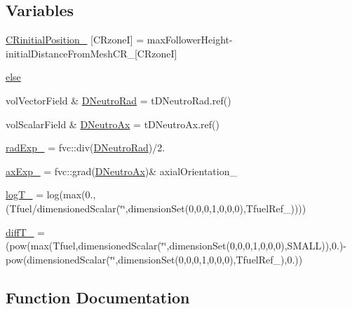 \subsection*{Variables}
\begin{DoxyCompactItemize}
\item 
\hyperlink{setNeutronicsVariablesLowMem_8H_a3990a4a796c70b16472b2334b671e69e}{C\+Rinitial\+Position\+\_\+} \mbox{[}C\+RzoneI\mbox{]} = max\+Follower\+Height-\/initial\+Distance\+From\+Mesh\+C\+R\+\_\+\mbox{[}C\+RzoneI\mbox{]}
\item 
\hyperlink{setNeutronicsVariablesLowMem_8H_a0544c3fe466e421738dae463968b70ba}{else}
\item 
vol\+Vector\+Field \& \hyperlink{setNeutronicsVariablesLowMem_8H_a87a8e73540cc64ca6321cea333ded9ac}{D\+Neutro\+Rad} = t\+D\+Neutro\+Rad.\+ref()
\item 
vol\+Scalar\+Field \& \hyperlink{setNeutronicsVariablesLowMem_8H_acbede4ae4993afe497317c8781340cb6}{D\+Neutro\+Ax} = t\+D\+Neutro\+Ax.\+ref()
\item 
\hyperlink{setNeutronicsVariablesLowMem_8H_a526ceca549702fe9fb823405772ca135}{rad\+Exp\+\_\+} = fvc\+::div(\hyperlink{setNeutronicsVariablesLowMem_8H_a87a8e73540cc64ca6321cea333ded9ac}{D\+Neutro\+Rad})/2.
\item 
\hyperlink{setNeutronicsVariablesLowMem_8H_a66bc5cc5f255b83ba2c9eb0c3a1f52cc}{ax\+Exp\+\_\+} = fvc\+::grad(\hyperlink{setNeutronicsVariablesLowMem_8H_acbede4ae4993afe497317c8781340cb6}{D\+Neutro\+Ax})\& axial\+Orientation\+\_\+
\item 
\hyperlink{setNeutronicsVariablesLowMem_8H_a7d8ac8fbf68a6681530b7d4920e37f95}{log\+T\+\_\+} = log(max(0.,(Tfuel/dimensioned\+Scalar(\char`\"{}\char`\"{},dimension\+Set(0,0,0,1,0,0,0),Tfuel\+Ref\+\_\+))))
\item 
\hyperlink{setNeutronicsVariablesLowMem_8H_a5237d6901ad5467f72c09eb6f926d4dd}{diff\+T\+\_\+} = (pow(max(Tfuel,dimensioned\+Scalar(\char`\"{}\char`\"{},dimension\+Set(0,0,0,1,0,0,0),S\+M\+A\+LL)),0.)-\/pow(dimensioned\+Scalar(\char`\"{}\char`\"{},dimension\+Set(0,0,0,1,0,0,0),Tfuel\+Ref\+\_\+),0.))
\end{DoxyCompactItemize}


\subsection{Function Documentation}
\mbox{\label{setNeutronicsVariablesLowMem_8H_a5db1e4741df8e4f4bf9d9c97cb5caebf}} 
